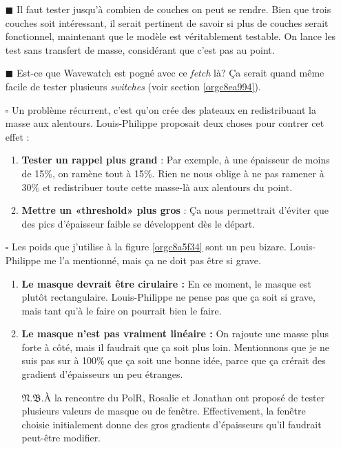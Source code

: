 \documentclass[10pt]{article}
\numberwithin{equation}{section}
\renewcommand{\boxtimes}{\blacksquare}
\newcommand{\pt}{\hspace{1pt}} %
\newcommand{\nb}{\underline{{\footnotesize\EightStarConvex}\pt $\mathfrak{N.B.}$\vphantom{p}}\hspace{3pt}}
\begin{document}
\begin{itemize}
\item[{$\boxtimes$}] Il faut tester jusqu'à combien de couches on peut se rendre.
Bien que trois couches soit intéressant, il serait pertinent de savoir si plus de couches serait fonctionnel, maintenant que le modèle est véritablement testable.
On lance les test sans transfert de masse, considérant que c'est pas au point.\bigskip

\item[{$\boxtimes$}] Est-ce que Wavewatch est pogné avec ce \emph{fetch} là? Ça serait quand même facile de tester plusieurs \emph{switches} (voir section \ref{orgc8ea994}). \bigskip

\item[{$\square$}] Un problème récurrent, c'est qu'on crée des plateaux en redistribuant la masse aux alentours.
Louis-Philippe proposait deux choses pour contrer cet effet :
\begin{enumerate}
\item \textbf{Tester un rappel plus grand} : Par exemple, à une épaisseur de moins de 15\%, on ramène tout à 15\%.
Rien ne nous oblige à ne pas ramener à 30\% et redistribuer toute cette masse-là aux alentours du point.
\item \textbf{Mettre un «threshold» plus gros} : Ça nous permettrait d'éviter que des pics d'épaisseur faible se développent dès le départ.\bigskip
\end{enumerate}

\item[{$\square$}] Les poids que j'utilise à la figure \ref{orgc8a5f34} sont un peu bizare.
Louis-Philippe me l'a mentionné, mais ça ne doit pas être si grave. 
\begin{enumerate}
\item \textbf{Le masque devrait être cirulaire :}
En ce moment, le masque est plutôt rectangulaire.
Louis-Philippe ne pense pas que ça soit si grave, mais tant qu'à le faire on pourrait bien le faire.
\item \textbf{Le masque n'est pas vraiment linéaire :} On rajoute une masse plus forte à côté, mais il faudrait que ça soit plus loin.
Mentionnons que je ne suis pas sur à 100\% que ça soit une bonne idée, parce que ça crérait des gradient d'épaisseurs un peu étranges.\bigskip

\nb À la rencontre du PolR, Rosalie et Jonathan ont proposé de tester plusieurs valeurs de masque ou de fenêtre.
Effectivement, la fenêtre choisie initialement donne des gros gradients d'épaisseurs qu'il faudrait peut-être modifier.\bigskip
\end{enumerate}


\end{itemize}
\end{document}
